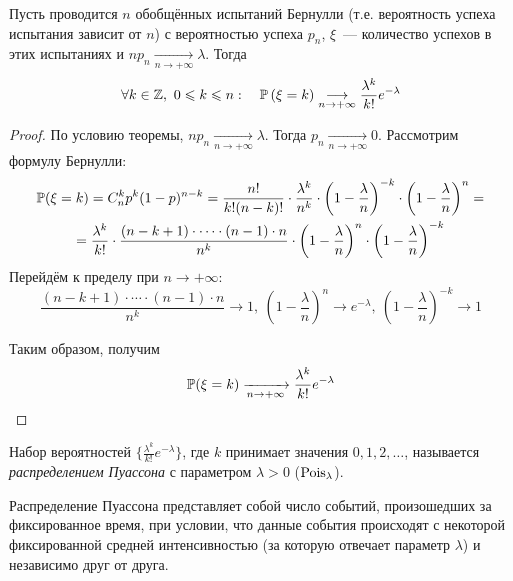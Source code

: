     \begin{namedthm}
        Пусть проводится $n$ обобщённых испытаний Бернулли (т.е. вероятность успеха испытания зависит от $n$) с вероятностью успеха $p_n$, $\xi$~--- количество успехов в этих испытаниях и $n p_{n} \underset{n \to +\infty}{\longrightarrow} \lambda$. Тогда
        \begin{equation*}
            \forall k \in \mathbb{Z},~ 0 \leqslant k \leqslant n: \quad \operatorname{\mathbb{P}}\left(\xi=k\right) \underset{n \to +\infty}{\longrightarrow} \frac{\lambda^{k}}{k !} e^{-\lambda}
        \end{equation*}
    \end{namedthm}
    
    \begin{proof}
        По условию теоремы, $n p_n \xrightarrow[n \to +\infty]{} \lambda$. Тогда $p_n \xrightarrow[n \to +\infty]{} 0$. Рассмотрим формулу Бернулли:
        \begin{multline*}
            \operatorname{\mathbb{P}}(\xi = k) = C_n^k p^k (1 - p)^{n-k} = \frac{n!}{k!(n - k)!} \cdot \frac{\lambda^k}{n^k} \cdot \left(1 - \frac{\lambda}{n}\right)^{-k} \cdot \left(1 - \frac{\lambda}{n}\right)^n = \\
            = \frac{\lambda^k}{k!} \cdot \frac{(n - k + 1) \cdot \cdots \cdot (n - 1) \cdot n}{n^k} \cdot \left(1 - \frac{\lambda}{n}\right)^n \cdot \left(1 - \frac{\lambda}{n}\right)^{-k}
        \end{multline*}
        Перейдём к пределу при $n \to +\infty$:
        \begin{equation*}
            \frac{(n - k + 1) \cdot \cdots \cdot (n - 1) \cdot n}{n^k} \to 1,~ \left(1 - \frac{\lambda}{n}\right)^n \to e^{-\lambda},~ \left(1 - \frac{\lambda}{n}\right)^{-k} \to 1
        \end{equation*}

        Таким образом, получим
        \begin{equation*}
            \operatorname{\mathbb{P}}(\xi = k) \xrightarrow[n \to +\infty]{} \frac{\lambda^k}{k!} e^{-\lambda} \qedhere
        \end{equation*}
\end{proof}
    
    \begin{defn}
        Набор вероятностей $\{\frac{\lambda^k}{k!} e^{-\lambda} \}$, где $k$ принимает значения $0, 1, 2, \ldots$, называется \textit{распределением Пуассона} с параметром $\lambda > 0$ ($\operatorname{\mathrm{Pois}}_{\lambda}$).
    \end{defn}
    \begin{rmrk}
        Распределение Пуассона представляет собой число событий, произошедших за фиксированное время, при условии, что данные события происходят с некоторой фиксированной средней интенсивностью (за которую отвечает параметр $\lambda$) и независимо друг от друга.
    \end{rmrk}
    

